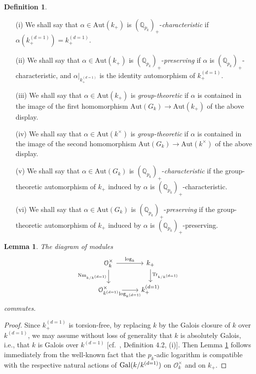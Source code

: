 \documentclass[12pt,showkeys]{amsart}
\theoremstyle{theorem}
\newtheorem{lem}[theorem]{Lemma}
\theoremstyle{definition}
\newtheorem{definition}[theorem]{Definition}
\def\bQ{{\mathbb Q}}
\def\Aut{{\mbox{Aut}}}
\begin{document}
\begin{definition}\label{definition:2.1}    
       \ \ \ 
\begin{enumerate}[label=(\roman*),ref=(\roman*)]
   \item[\rm (i)]  We shall say that $\alpha \in \Aut(k_+)$ is $(\bQ_{p_k})_+$-{\it characteristic} if $\alpha(k^{(d=1)}_+) = k^{(d=1)}_+$. \label{definition:2.1:statement1} 
   \item[\rm (ii)] We shall say that $\alpha \in \Aut(k_+)$ is $(\bQ_{p_k})_+$-{\it preserving} if $\alpha$ is $(\bQ_{p_k})_+$-characteristic, and $\left. \alpha \right|_{k^{(d=1)}_+}$ is the identity automorphism of $k_+^{(d=1)}$.  \label{definition:2.1:statement:2} 
   \item[\rm (iii)]  We shall say that $\alpha \in \Aut(k_+)$ is {\it group-theoretic} if $\alpha$ is contained in the image of the first homomorphism $\Aut(G_k) \to \Aut(k_+)$ of the above display. \label{definition:2.1:statement:3} 
\item[\rm (iv)]  We shall say that $\alpha \in \Aut(k^{\times})$ is {\it group-theoretic} if $\alpha$ is contained in the image of the second homomorphism $\Aut(G_k) \to \Aut(k^\times)$ of the above display. \label{definition:2.1:statement:4}    
   \item[\rm (v)]  We shall say that $\alpha \in \Aut(G_k)$ is $(\bQ_{p_k})_+$-{\it characteristic} if the group-theoretic automorphism of $k_+$ induced by $\alpha$ is $(\bQ_{p_k})_+$-characteristic. \label{definition:2.1:statement:5} 
   \item[\rm (vi)] We shall say that $\alpha \in \Aut(G_k)$ is $(\bQ_{p_k})_+$-{\it preserving} if the group-theoretic automorphism of $k_+$ induced by $\alpha$ is $(\bQ_{p_k})_+$-preserving.  \label{definition:2.1:statement:6} 
\end{enumerate}
\end{definition}

\begin{lem}\label{lemma:new:2.2}
The diagram of modules 
\[
\begin{tikzcd}
\mathcal{O}_k^{\times} \arrow[r, "{\log}_k"] \arrow[d, "{\rm Nm}_{k/k^{(d=1)}}"'] & k_+ \arrow[d, "{\rm Tr}_{k/k^{(d=1)}}"] \\
\mathcal{O}_{k^{(d=1)}}^{\times} \arrow[r, "{\log}_{k^{(d=1)}}"']                              & k^{(d=1)}_+             
\end{tikzcd}
\]
commutes.
\end{lem}
\begin{proof}
Since $k^{(d=1)}_+$ is torsion-free, by replacing $k$ by the Galois closure of $k$ over $k^{(d=1)}$, we may assume without loss of generality that $k$ is absolutely Galois, i.e., that $k$ is Galois over $k^{(d=1)}$ [cf.\ \cite{Hoshi2}, Definition 4.2, (i)].  
Then Lemma \ref{lemma:new:2.2} follows immediately from the well-known fact that the $p_k$-adic logarithm is compatible with the respective natural actions of ${\rm Gal} (k/ k^{(d=1)})$ on $\mathcal{O}_k^\times$ and on $k_+$.  
\end{proof}
\end{document}
